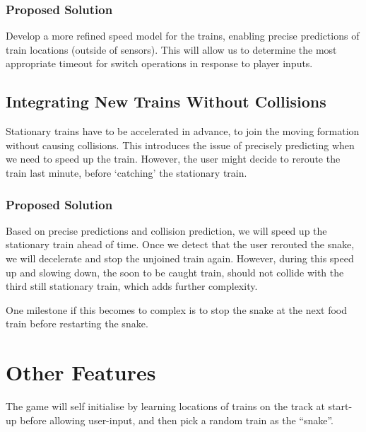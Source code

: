 \documentclass[10pt]{article}
\begin{document}
\subsubsection*{Proposed Solution}
Develop a more refined speed model for the trains, enabling precise predictions of train locations (outside of sensors). This will allow us to determine the most appropriate timeout for switch operations in response to player inputs.

\subsection{Integrating New Trains Without Collisions}
Stationary trains have to be accelerated in advance, to join the moving formation without causing collisions. This introduces the issue of precisely predicting when we need to speed up the train. However, the user might decide to reroute the train last minute, before `catching' the stationary train.

\subsubsection*{Proposed Solution}
Based on precise predictions and collision prediction, we will speed up the stationary train ahead of time.
Once we detect that the user rerouted the snake, we will decelerate and stop the unjoined train again.
However, during this speed up and slowing down, the soon to be caught train, should not collide with the third still stationary train, which adds further complexity.

One milestone if this becomes to complex is to stop the snake at the next food train before restarting the snake.

\section{Other Features}

The game will self initialise by learning locations of trains on the track at start-up before allowing user-input, and then pick a random train as the ``snake''.
\end{document}
